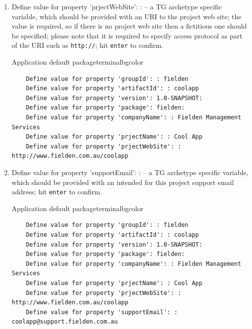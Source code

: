 \begin{enumerate}
    \begin{code}{Application default package}{\label{lst::archetype-package}}{terminalbgcolor}
      \begin{lstlisting}
	Define value for property 'groupId': : fielden		
	Define value for property 'artifactId': : coolapp
	Define value for property 'version': 1.0-SNAPSHOT:
	Define value for property 'package': fielden:
	Define value for property 'companyName': : Fielden Management Services
	Define value for property 'prjectName': : Cool App
      \end{lstlisting}
    \end{code}

    \item Define value for property 'prjectWebSite': : -- a TG archetype specific variable, which should be provided with an URI to the project web site; the value is required, so if there is no project web site then a fictitious one should be specified; please note that it is required to specify access protocol as part of the URI such as \texttt{http://}; hit \texttt{enter} to confirm.
    
    \begin{code}{Application default package}{\label{lst::archetype-package}}{terminalbgcolor}
      \begin{lstlisting}
	Define value for property 'groupId': : fielden		
	Define value for property 'artifactId': : coolapp
	Define value for property 'version': 1.0-SNAPSHOT:
	Define value for property 'package': fielden:	
	Define value for property 'companyName': : Fielden Management Services
	Define value for property 'prjectName': : Cool App
	Define value for property 'prjectWebSite': : http://www.fielden.com.au/coolapp
      \end{lstlisting}
    \end{code}

    \item Define value for property 'supportEmail': : -- a TG archetype specific variable, which should be provided with an intended for this project support email address; hit \texttt{enter} to confirm.
    
    \begin{code}{Application default package}{\label{lst::archetype-package}}{terminalbgcolor}
      \begin{lstlisting}
	Define value for property 'groupId': : fielden		
	Define value for property 'artifactId': : coolapp
	Define value for property 'version': 1.0-SNAPSHOT:
	Define value for property 'package': fielden:	
	Define value for property 'companyName': : Fielden Management Services
	Define value for property 'prjectName': : Cool App
	Define value for property 'prjectWebSite': : http://www.fielden.com.au/coolapp
	Define value for property 'supportEmail': : coolapp@support.fielden.com.au
      \end{lstlisting}
    \end{code}

  \end{enumerate}

